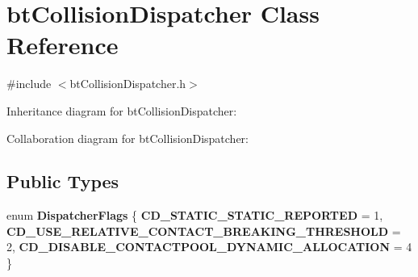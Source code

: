 \hypertarget{classbt_collision_dispatcher}{\section{bt\+Collision\+Dispatcher Class Reference}
\label{classbt_collision_dispatcher}
}


{\ttfamily \#include $<$bt\+Collision\+Dispatcher.\+h$>$}



Inheritance diagram for bt\+Collision\+Dispatcher\+:


Collaboration diagram for bt\+Collision\+Dispatcher\+:
\subsection*{Public Types}
\begin{DoxyCompactItemize}
\item 
\hypertarget{classbt_collision_dispatcher_a9aa413a2145825d052e73ae1d22aee93}{enum {\bfseries Dispatcher\+Flags} \{ {\bfseries C\+D\+\_\+\+S\+T\+A\+T\+I\+C\+\_\+\+S\+T\+A\+T\+I\+C\+\_\+\+R\+E\+P\+O\+R\+T\+E\+D} = 1, 
{\bfseries C\+D\+\_\+\+U\+S\+E\+\_\+\+R\+E\+L\+A\+T\+I\+V\+E\+\_\+\+C\+O\+N\+T\+A\+C\+T\+\_\+\+B\+R\+E\+A\+K\+I\+N\+G\+\_\+\+T\+H\+R\+E\+S\+H\+O\+L\+D} = 2, 
{\bfseries C\+D\+\_\+\+D\+I\+S\+A\+B\+L\+E\+\_\+\+C\+O\+N\+T\+A\+C\+T\+P\+O\+O\+L\+\_\+\+D\+Y\+N\+A\+M\+I\+C\+\_\+\+A\+L\+L\+O\+C\+A\+T\+I\+O\+N} = 4
 \}}\label{classbt_collision_dispatcher_a9aa413a2145825d052e73ae1d22aee93}

\end{DoxyCompactItemize}
